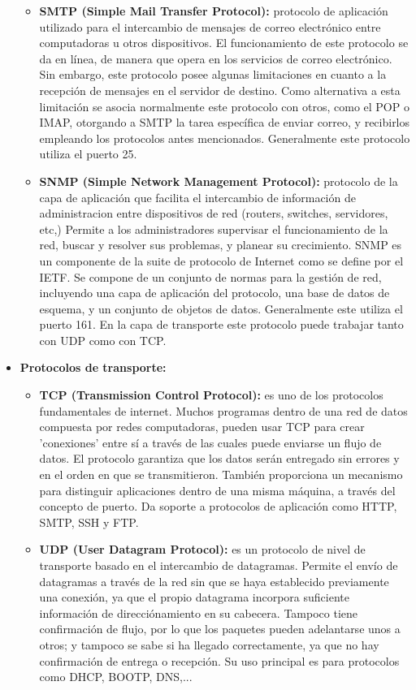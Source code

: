 \documentclass[a4paper,11pt]{article}
\begin{document}
\begin{itemize}
\begin{itemize}
		\item \textbf{SMTP (Simple Mail Transfer Protocol):} protocolo de aplicación utilizado para el intercambio de mensajes de correo electrónico entre computadoras u otros dispositivos. El funcionamiento de este protocolo se da en línea, de manera que opera en los servicios de correo electrónico. Sin embargo, este protocolo posee algunas limitaciones en cuanto a la recepción de mensajes en el servidor de destino. Como alternativa a esta limitación se asocia normalmente este protocolo con otros, como el POP o IMAP, otorgando a SMTP la tarea específica de enviar correo, y recibirlos empleando los protocolos antes mencionados. Generalmente este protocolo utiliza el puerto 25.
		
		\item \textbf{SNMP (Simple Network Management Protocol):} protocolo de la capa de aplicación que facilita el intercambio de información de administracion entre dispositivos de red (routers, switches, servidores, etc,) Permite a los administradores supervisar el funcionamiento de la red, buscar y resolver sus problemas, y planear su crecimiento. SNMP es un componente de la suite de protocolo de Internet como se define por el IETF. Se compone de un conjunto de normas para la gestión de red, incluyendo una capa de aplicación del protocolo, una base de datos de esquema, y un conjunto de objetos de datos. Generalmente este utiliza el puerto 161. En la capa de transporte este protocolo puede trabajar tanto con UDP como con TCP.
	\end{itemize}
	
\item \textbf{Protocolos de transporte:}
	
	\begin{itemize}
		\item \textbf{TCP (Transmission Control Protocol):} es uno de los protocolos fundamentales de internet. Muchos programas dentro de una red de datos compuesta por redes computadoras, pueden usar TCP para crear 'conexiones' entre sí a través de las cuales puede enviarse un flujo de datos. El protocolo garantiza que los datos serán entregado sin errores y en el orden en que se transmitieron. También proporciona un mecanismo para distinguir aplicaciones dentro de una misma máquina, a través del concepto de puerto. Da soporte a protocolos de aplicación como HTTP, SMTP, SSH y FTP.
		
		\item \textbf{UDP (User Datagram Protocol):} es un protocolo de nivel de transporte basado en el intercambio de datagramas. Permite el envío de datagramas a través de la red sin que se haya establecido previamente una conexión, ya que el propio datagrama incorpora suficiente información de direcciónamiento en su cabecera. Tampoco tiene confirmación de flujo, por lo que los paquetes pueden adelantarse unos a otros; y tampoco se sabe si ha llegado correctamente, ya que no hay confirmación de entrega o recepción. Su uso principal es para protocolos como DHCP, BOOTP, DNS,...
	\end{itemize}


\end{itemize}
\end{document}
